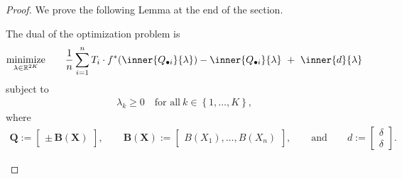 \begin{proof}
  We prove the following Lemma at the end of the section.
  \begin{lemma}
    The dual of the optimization problem is
  \begin{gather*}
    \underset{\lambda \in \R^{2K}}{\mathrm{minimize}}
    \qquad
    \frac{1}{n}
    \sum_{i = 1}^{n} 
    T_i 
    \cdot
    f^*
    (
    \inner{Q_{\bullet i}}{\lambda}
    )
    -
    \inner{Q_{\bullet i}}{\lambda}
    \ 
    +
    \ 
    \inner{d}{\lambda}
  \end{gather*}
  subject to
  \begin{gather*}
    \lambda_k \ge 0
    \quad
    \text{for all}\ 
    k \in \left\{ 1, \ldots, K \right\}
    ,
  \end{gather*}
  where
  \begin{gather*}
    \mathbf{Q}
    :=
    \begin{bmatrix}
      \pm \, \mathbf{B}(\mathbf{X})
    \end{bmatrix}
    ,
    \qquad
    \mathbf{B}(\mathbf{X})
    :=
    \begin{bmatrix}
      B(X_1), \ldots, B(X_n)
    \end{bmatrix}
    ,
    \qquad
    \text{and}
    \qquad
    d
    :=
    \begin{bmatrix}
      \delta \\
      \delta
    \end{bmatrix}
    .
  \end{gather*}


\end{lemma}
\end{proof}
